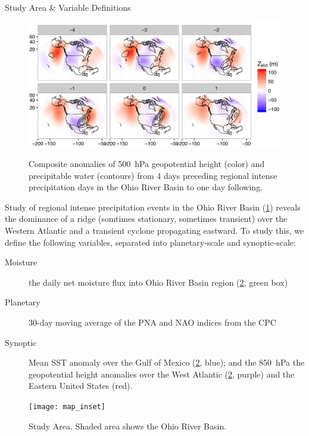 \begin{block}{Study Area \& Variable Definitions}
    \begin{figure}
        \centering
        \caption{Composite anomalies of \SI{500}{\hecto\pascal} geopotential height (color) and precipitable water (contours) from 4 days preceding regional intense precipitation days in the Ohio River Basin to one day following.}
        \includegraphics[width=\columnwidth]{../FigExternal/djf_composites}
        \label{fig:djf-composites}
    \end{figure}
    Study of regional intense precipitation events in the Ohio River Basin (\cref{fig:djf-composites}) reveals the dominance of a ridge (somtimes stationary, sometimes transient) over the Western Atlantic and a transient cyclone propagating eastward.
    To study this, we define the following variables, separated into planetary-scale and synoptic-scale:
    \begin{description}
        \item[Moisture] the daily net moisture flux into Ohio River Basin region (\cref{fig:study-area}, green box)
        \item[Planetary] 30-day moving average of the PNA and NAO indices from the CPC
        \item[Synoptic] Mean SST anomaly over the Gulf of Mexico (\cref{fig:study-area}, blue); and the \SI{850}{\hecto\pascal} the geopotential height anomalies over the West Atlantic (\cref{fig:study-area}, purple) and the Eastern United States (red).
    \end{description}
    \begin{figure}
        \centering
        \texttt{[image: map\_inset]}
        \caption{Study Area. Shaded area shows the Ohio River Basin.}
        \label{fig:study-area}
    \end{figure}
\end{block}
